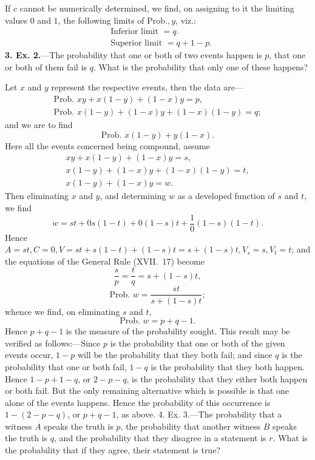 \documentclass[oneside]{book}
\begin{document}
If $c$ cannot be numerically determined, we find, on assigning
to it the limiting values $0$ and $1$, the following limits of $\mathrm{Prob. },y$,
viz.:
\begin{align*}
  &\text{Inferior limit $= q$.}   \\
  &\text{Superior limit $= q + 1-p$.}
\end{align*}
\textbf{3. Ex. 2.}---The probability that one or both of two events
happen is $p$, that one or both of them fail is $q$. What is the
probability that only one of these happens?

Let $x$ and $y$ represent the respective events, then the data are---
\[
\begin{array}{c}
\text{Prob. }xy + x (1-y) + (1-x)y = p, \\
\text{Prob. }x(1-y) + (1-x)y + (1-x)(1-y) = q;
\end{array}
\]
and we are to find
\[\text{Prob. }x(1-y) + y(1-x).\]
Here all the events concerned being compound, assume
\[
\begin{array}{c}
xy + x(1-y) + (1-x)y = s, \\
x(1-y) + (1-x)y + (1-x)(1-y) = t, \\
x(1-y) + (1-x)y = w.
\end{array}
\]
Then eliminating $x$ and $y$, and determining $w$ as a developed
function of $s$ and $t$, we find
\[w = st + 0 s(1-t) + 0 (1-s)t + \frac{1}{0} (1-s)(1-t).\]
Hence $A = st, C=0, V=st + s(1-t) + (1-s)t = s + (1-s)t,
V_s=s, V_t=t$; and the equations of the General Rule (XVII.~17)
become
\begin{equation}
\frac{s}{p} = \frac{t}{q} = s + (1-s)t, \tag{1}
\end{equation}
\[
\text{Prob. }w = \frac{st}{s + (1-s)t};
\]
whence we find, on eliminating $s$ and $t$,
\[
\text{Prob. }w = p + q - 1.
\]
Hence $p + q - 1$ is the measure of the probability sought. This
result may be verified as follows:---Since $p$ is the probability that
one or both of the given events occur, $1-p$ will be the probability
that they both fail; and since $q$ is the probability that one
or both fail, $1-q$ is the probability that they both happen.
Hence $1-p + 1-q$, or $2-p-q$, is the probability that they
either both happen or both fail. But the only remaining alternative
which is possible is that one alone of the events happens.
Hence the probability of this occurrence is $1-(2-p-q)$, or
$p + q - 1$, as above.
4. Ex. 3.---The probability that a witness $A$ speaks the truth
is $p$, the probability that another witness $B$ speaks the truth is $q$,
and the probability that they disagree in a statement is $r$. What
is the probability that if they agree, their statement is true?
\end{document}
